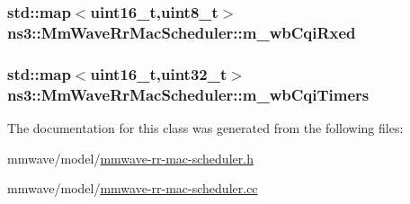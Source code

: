 \subsubsection[{\texorpdfstring{m\+\_\+wb\+Cqi\+Rxed}{m_wbCqiRxed}}]{\setlength{\rightskip}{0pt plus 5cm}std\+::map$<$uint16\+\_\+t,uint8\+\_\+t$>$ ns3\+::\+Mm\+Wave\+Rr\+Mac\+Scheduler\+::m\+\_\+wb\+Cqi\+Rxed\hspace{0.3cm}{\ttfamily [private]}}\hypertarget{classns3_1_1MmWaveRrMacScheduler_ab048c846f6d5d71795b65b9f91c6766a}{}\label{classns3_1_1MmWaveRrMacScheduler_ab048c846f6d5d71795b65b9f91c6766a}
\subsubsection[{\texorpdfstring{m\+\_\+wb\+Cqi\+Timers}{m_wbCqiTimers}}]{\setlength{\rightskip}{0pt plus 5cm}std\+::map$<$uint16\+\_\+t,uint32\+\_\+t$>$ ns3\+::\+Mm\+Wave\+Rr\+Mac\+Scheduler\+::m\+\_\+wb\+Cqi\+Timers\hspace{0.3cm}{\ttfamily [private]}}\hypertarget{classns3_1_1MmWaveRrMacScheduler_ae70383b2b2b66701ea96205d5ad60c41}{}\label{classns3_1_1MmWaveRrMacScheduler_ae70383b2b2b66701ea96205d5ad60c41}


The documentation for this class was generated from the following files\+:\begin{DoxyCompactItemize}
\item 
mmwave/model/\hyperlink{mmwave-rr-mac-scheduler_8h}{mmwave-\/rr-\/mac-\/scheduler.\+h}\item 
mmwave/model/\hyperlink{mmwave-rr-mac-scheduler_8cc}{mmwave-\/rr-\/mac-\/scheduler.\+cc}\end{DoxyCompactItemize}
